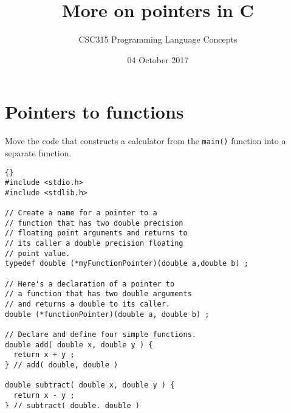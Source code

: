 \documentclass[twosides]{article}
\title{More on pointers in C}
\author{CSC315 Programming Language Concepts}
\date{04 October 2017}
\begin{document}
\maketitle

\section{Pointers to functions}

Move the code that constructs a calculator
from the \lstinline+main()+ function into
a separate function.

\begin{lstlisting}{}
#include <stdio.h>
#include <stdlib.h>

// Create a name for a pointer to a 
// function that has two double precision
// floating point arguments and returns to
// its caller a double precision floating
// point value.
typedef double (*myFunctionPointer)(double a,double b) ;

// Here's a declaration of a pointer to
// a function that has two double arguments
// and returns a double to its caller.
double (*functionPointer)(double a, double b) ;

// Declare and define four simple functions.
double add( double x, double y ) {
  return x + y ;
} // add( double, double )

double subtract( double x, double y ) {
  return x - y ;
} // subtract( double, double )

double multiply( double x, double y ) {
  return x * y ;
} // multiply( double, double )

double divide( double x, double y ) {
  return x / y ;
} // divide( double, double )

// Define a data structure
// that contains pointers to functions.
struct calculator {
  myFunctionPointer ap ;
  myFunctionPointer sp ;
  myFunctionPointer mp ;
  myFunctionPointer dp ;
} ;


// Create aliases for the struct and for pointers
// to the struct.
typedef struct calculator Calculator, *CalculatorPointer ;


int main( int argc, char **argv ) {

  functionPointer = add ;

  printf( "size of function pointer = %d\n",
      sizeof(functionPointer)) ;
  printf( "3 + 4 = %8.4f\n", functionPointer(3,4)) ;

  // Create a struct that contains pointers to four functions.
  // Store the address of the struct in a pointer.
  CalculatorPointer cp =
      (CalculatorPointer) malloc(sizeof(Calculator)) ;
  

\end{lstlisting}
\end{document}
